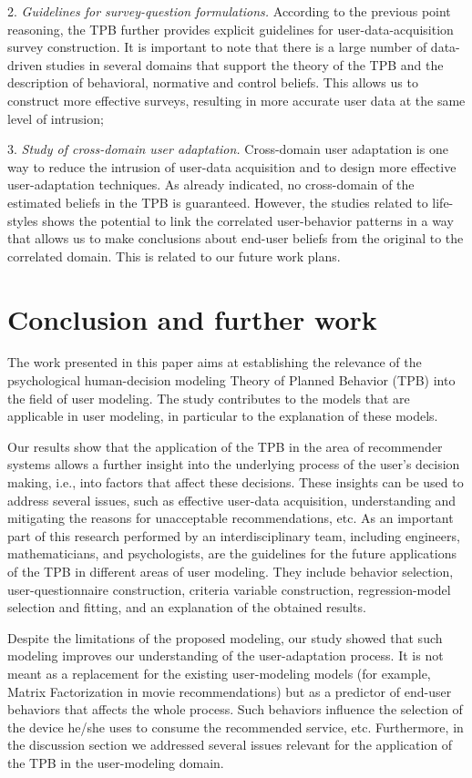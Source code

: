 \documentclass{llncs}
\begin{document}
2. {\it Guidelines for survey-question formulations.} According to the previous point reasoning, the TPB further provides explicit guidelines for user-data-acquisition survey construction. It is important to note that there is a large number of data-driven studies in several domains that support the theory of the TPB and the description of behavioral, normative and control beliefs. This allows us to construct more effective surveys, resulting in more accurate user data at the same level of intrusion;  

3.  {\it Study of cross-domain user adaptation.} Cross-domain user adaptation is one way to reduce the intrusion of user-data acquisition and to design more effective user-adaptation techniques. As already indicated, no cross-domain of the estimated beliefs in the TPB is guaranteed. However, the studies related to life-styles shows the potential to link the correlated user-behavior patterns in a way that allows us to make conclusions about end-user beliefs from the original to the correlated domain. This is related to our future work plans.


\section{Conclusion and further work}\label{Sec_ConcAndFW}

The work presented in this paper aims at establishing the relevance of the psychological human-decision modeling Theory of Planned Behavior (TPB) into the field of user modeling. The study contributes to the models that are applicable in user modeling, in particular to the explanation of these models.

Our results show that the application of the TPB in the area of recommender systems allows a further insight into the underlying process of the user’s decision making, i.e., into factors that affect these decisions. These insights can be used to address several issues, such as effective user-data acquisition, understanding and mitigating the reasons for unacceptable recommendations, etc. As an important part of this research performed by an interdisciplinary team, including engineers, mathematicians, and psychologists, are the guidelines for the future applications of the TPB in different areas of user modeling. They include behavior selection, user-questionnaire construction, criteria variable construction, regression-model selection and fitting, and an explanation of the obtained results.

Despite the limitations of the proposed modeling, our study showed that such modeling improves our understanding of the user-adaptation process. It is not meant as a replacement for the existing user-modeling models (for example, Matrix Factorization in movie recommendations) but as a predictor of end-user behaviors that affects the whole process. Such behaviors influence the selection of the device he/she uses to consume the recommended service, etc. Furthermore, in the discussion section we addressed several issues relevant for the application of the TPB in the user-modeling domain.
\end{document}

